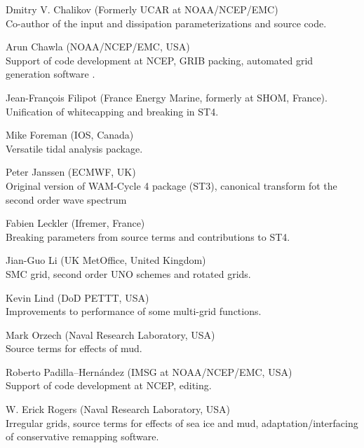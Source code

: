 \begin{list}{\ldots}{ }
\item [Dmitry V. Chalikov] (Formerly UCAR at NOAA/NCEP/EMC) \\ Co-author of the
  \cite{tol:JPO96} input and dissipation parameterizations and source code.

\item [Arun Chawla](NOAA/NCEP/EMC, USA) \\
  Support of code development at NCEP, GRIB packing, automated grid generation
  software \citep{tol:MMAB07a, tol:OMOD08a}.

\item [Jean-Fran{\c c}ois Filipot] (France Energy Marine, formerly at SHOM, France).\\
  Unification of whitecapping and breaking in ST4. 

\item [Mike Foreman]  (IOS, Canada) \\
  Versatile tidal analysis package. 

\item [Peter Janssen] (ECMWF, UK) \\
  Original version of WAM-Cycle 4 package (ST3), canonical transform fot the second order wave spectrum 

\item [Fabien Leckler] (Ifremer, France) \\
  Breaking parameters from source terms and contributions to ST4.

\item [Jian-Guo Li] (UK MetOffice, United Kingdom) \\
  SMC grid, second order UNO schemes and rotated grids.

\item [Kevin Lind]  (DoD PETTT, USA)\\ 
  Improvements to performance of some multi-grid functions.

\item [Mark Orzech]  (Naval Research Laboratory, USA)\\ 
  Source terms for effects of mud.

\item [Roberto Padilla--Hern\'andez]  (IMSG at NOAA/NCEP/EMC, USA)\\ 
  Support of code development at NCEP, editing.
   
\item [W. Erick Rogers]  (Naval Research Laboratory, USA)\\ 
  Irregular grids, source terms for effects of sea ice and mud, 
  adaptation/interfacing of conservative remapping software.


\end{list}
